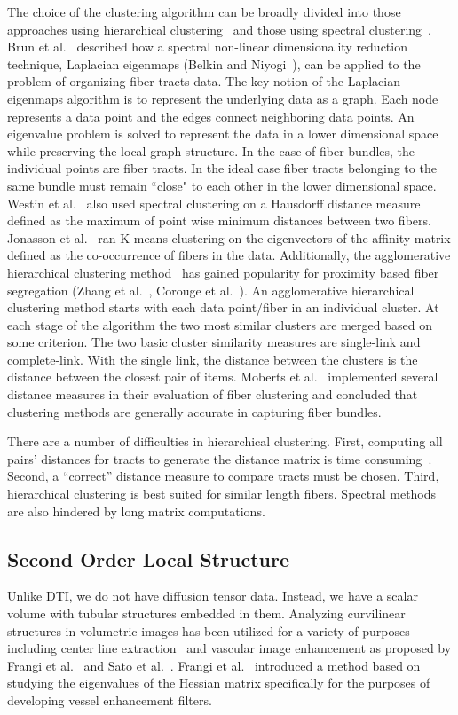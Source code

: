 The choice of the clustering algorithm can be broadly divided into those approaches using hierarchical clustering~\cite{Moberts2005, Zhang2008} and those using spectral clustering~\cite{Brun2004,jonasson2005, ODonnell2007}.
Brun et al.~\cite{Brun2003} described how a spectral non-linear dimensionality reduction technique, Laplacian eigenmaps (Belkin and Niyogi~\cite{Belkin01}), can be applied to the problem of organizing fiber tracts data. The key notion of the Laplacian eigenmaps algorithm is to represent the underlying data as a graph. Each node represents a data point and the edges connect neighboring data points. An eigenvalue problem is solved to represent the data in a lower dimensional space while preserving the local graph structure. In the case of fiber bundles, the individual points are fiber tracts. In the ideal case fiber tracts belonging to the same bundle must remain ``close" to each other in the lower dimensional space. Westin et al.~\cite{westinMEDIA02} also used spectral clustering on a Hausdorff distance measure defined as the maximum of point wise minimum distances between two fibers. Jonasson et al.~\cite{jonasson2005} ran K-means clustering on the eigenvectors of the affinity matrix defined as the co-occurrence of fibers in the data.
Additionally, the agglomerative hierarchical clustering method~\cite{DudaHartStork01} has gained popularity for proximity based fiber segregation (Zhang et al.~\cite{Zhang2008}, Corouge et al.~\cite{Corouge2004}). 
An agglomerative hierarchical clustering method starts with each data point/fiber in an individual cluster. At each stage of the algorithm the two most similar clusters are merged based on some criterion. The two basic cluster similarity measures are single-link and complete-link. With the single link, the distance between the clusters is the distance between the closest pair of items. 
Moberts et al.~\cite{Moberts2005} implemented several distance measures in their evaluation of fiber clustering and concluded that clustering methods are generally accurate in capturing fiber bundles. 
 
There are a number of difficulties in hierarchical clustering. First, computing all pairs' distances for tracts to generate the distance matrix is time consuming~\cite{Garyfallidis2012}. Second, a ``correct'' distance measure to compare tracts must be chosen. Third, hierarchical clustering is best suited for similar length fibers.
Spectral methods are also hindered by long matrix computations.


\subsection{Second Order Local Structure}
Unlike DTI, we do not have diffusion tensor data. Instead, we have a scalar volume with tubular structures embedded in them. Analyzing curvilinear structures in volumetric images has been utilized for a variety of purposes including center line extraction~\cite{Bouix2005} and vascular image enhancement as proposed by Frangi et al.~\cite{Frangi1998} and Sato et al.~\cite{Sato1997}. Frangi et al.~\cite{Frangi1998} introduced a method based on studying the eigenvalues of the Hessian matrix specifically for the purposes of developing vessel enhancement filters.

